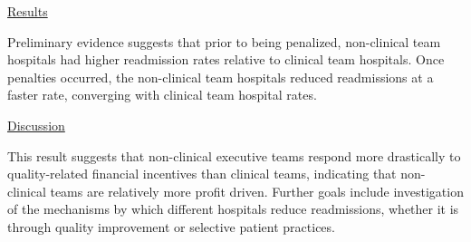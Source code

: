 \documentclass[12pt]{article}
\begin{document}
\vspace{2mm}

\noindent \underline{Results}

Preliminary evidence suggests that prior to being penalized, non-clinical team hospitals had higher readmission rates relative to clinical team hospitals. Once penalties occurred, the non-clinical team hospitals reduced readmissions at a faster rate, converging with clinical team hospital rates. 

\vspace{2mm}

\noindent \underline{Discussion}

This result suggests that non-clinical executive teams respond more drastically to quality-related financial incentives than clinical teams, indicating that non-clinical teams are relatively more profit driven. Further goals include investigation of the mechanisms by which different hospitals reduce readmissions, whether it is through quality improvement or selective patient practices.  


    

    

    

    

    

	
	
	
\end{document}
